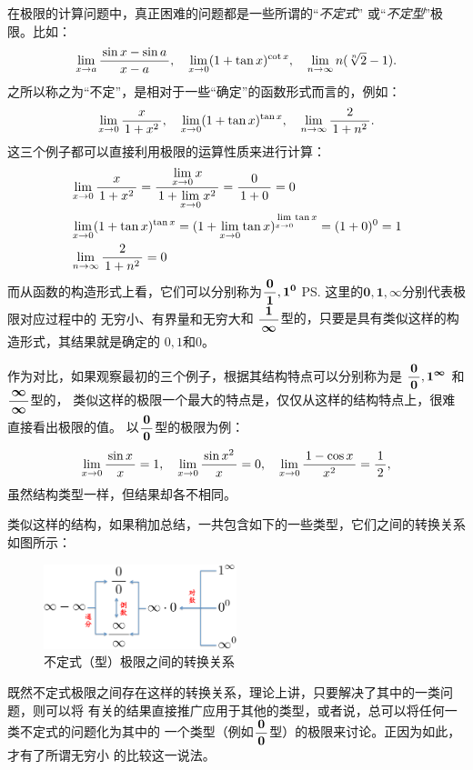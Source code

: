 在极限的计算问题中，真正困难的问题都是一些所谓的“{\it 不定式}”
或“{\it 不定型}”极限。比如：
$$\limx{a}\df{\sin x-\sin a}{x-a},\quad \limx{0}(1+\tan x)^{\cot x},
\quad \limn n(\sqrt[n]2-1).$$
之所以称之为“不定”，是相对于一些“确定”的函数形式而言的，例如：
$$\limx{0}\df{x}{1+x^2},\quad \limx{0}(1+\tan x)^{\tan x},
\quad \limn\df{2}{1+n^2}.$$
这三个例子都可以直接利用极限的运算性质来进行计算：
\begin{align*}
	&\limx{0}\df{x}{1+x^2}=\df{\limx{0} x}{1+\limx{0}x^2}=\df0{1+0}=0\\
	&\limx{0}(1+\tan x)^{\tan x}=(1+\limx{0}\tan x)^{\limx{0}\tan x}
	=(1+0)^0=1\\
	&\limn\df{2}{1+n^2}=0
\end{align*}
而从函数的构造形式上看，它们可以分别称为$\df{\bm{0}}{\bm{1}},\bm{1^0}$
\ps{这里的$\bm{0},\bm{1},\bm{\infty}$分别代表极限对应过程中的
无穷小、有界量和无穷大}和
$\df{\bm{1}}{\bm{\infty}}$型的，只要是具有类似这样的构造形式，其结果就是确定的
$0,1$和$0$。

作为对比，如果观察最初的三个例子，根据其结构特点可以分别称为是
$\df{\bm0}{\bm0},\bm{1^{\infty}}$
和$\df{\bm{\infty}}{\bm{\infty}}$型的，
类似这样的极限一个最大的特点是，仅仅从这样的结构特点上，很难直接看出极限的值。
以$\df{\bm0}{\bm0}$型的极限为例：
$$\limx{0}\df{\sin x}x=1,
\quad \limx{0}\df{\sin x^2}x=0,
\quad \limx{0}\df{1-\cos x}{x^2}=\df12,$$
虽然结构类型一样，但结果却各不相同。

类似这样的结构，如果稍加总结，一共包含如下的一些类型，它们之间的转换关系如图所示：
	
\begin{figure}[h]
	\centering
	\includegraphics[width=0.5\textwidth]{./Images/Ch01/lim00.pdf}
	\caption{不定式（型）极限之间的转换关系}
	\label{fig:lim00}
\end{figure}

既然不定式极限之间存在这样的转换关系，理论上讲，只要解决了其中的一类问题，则可以将
有关的结果直接推广应用于其他的类型，或者说，总可以将任何一类不定式的问题化为其中的
一个类型（例如$\df{\bm0}{\bm0}$型）的极限来讨论。正因为如此，才有了所谓无穷小
的比较这一说法。

